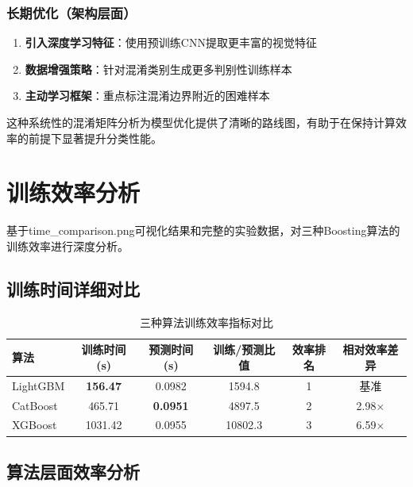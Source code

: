 \documentclass[UTF8]{report}
\theoremstyle{MyLineTheoremStyle} %
\theoremstyle{MyBlockTheoremStyle} %
\theoremstyle{MySubsubsectionStyle} %
\begin{document}
\subsubsection{长期优化（架构层面）}
\begin{enumerate}
    \item \textbf{引入深度学习特征}：使用预训练CNN提取更丰富的视觉特征
    \item \textbf{数据增强策略}：针对混淆类别生成更多判别性训练样本
    \item \textbf{主动学习框架}：重点标注混淆边界附近的困难样本
\end{enumerate}
这种系统性的混淆矩阵分析为模型优化提供了清晰的路线图，有助于在保持计算效率的前提下显著提升分类性能。

\section{训练效率分析}
基于time\_comparison.png可视化结果和完整的实验数据，对三种Boosting算法的训练效率进行深度分析。
\subsection{训练时间详细对比}
\begin{table}[H]
    \centering
    \caption{三种算法训练效率指标对比}
    \begin{tabular}{lccccc}
        \toprule
        算法 & 训练时间(s) & 预测时间(s) & 训练/预测比值 & 效率排名 & 相对效率差异 \\
        \midrule
        LightGBM & \textbf{156.47} & 0.0982 & 1594.8 & 1 & 基准 \\
        CatBoost & 465.71 & \textbf{0.0951} & 4897.5 & 2 & 2.98× \\
        XGBoost & 1031.42 & 0.0955 & 10802.3 & 3 & 6.59× \\
        \bottomrule
    \end{tabular}
\end{table}

\subsection{算法层面效率分析}
\end{document}
